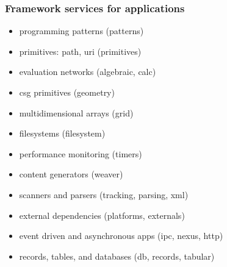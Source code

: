 \begin{frame}
%
  \frametitle{Framework services for applications}
%
  \begin{itemize}
  \item programming patterns (patterns)
  \item primitives: path, uri (primitives)
  \item evaluation networks (algebraic, calc)
  \item csg primitives (geometry)
  \item multidimensional arrays (grid)
  \item filesystems (filesystem)
  \item performance monitoring (timers)
  \item content generators (weaver)
  \item scanners and parsers (tracking, parsing, xml)
  \item external dependencies (platforms, externals)
  \item event driven and asynchronous apps (ipc, nexus, http)
  \item records, tables, and databases (db, records, tabular)
  \end{itemize}
%
\end{frame}


